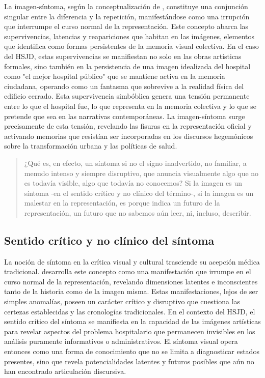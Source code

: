 La imagen-síntoma, según la conceptualización de \parencite{DidiHuberman2011}, constituye una conjunción singular entre la diferencia y la repetición, manifestándose como una irrupción que interrumpe el curso normal de la representación. Este concepto abarca las supervivencias, latencias y reapariciones que habitan en las imágenes, elementos que \parencite{Warburg2010} identifica como formas persistentes de la memoria visual colectiva. En el caso del HSJD, estas supervivencias se manifiestan no solo en las obras artísticas formales, sino también en la persistencia de una imagen idealizada del hospital como "el mejor hospital público" que se mantiene activa en la memoria ciudadana, operando como un fantasma que sobrevive a la realidad física del edificio cerrado. Esta supervivencia simbóblica genera una tensión permanente entre lo que el hospital fue, lo que representa en la memoria colectiva y lo que se pretende que sea en las narrativas contemporáneas. La imagen-síntoma surge precisamente de esta tensión, revelando las fisuras en la representación oficial y activando memorias que resistían ser incorporadas en los discursos hegemónicos sobre la transformación urbana y las políticas de salud.

\begin{quote}
¿Qué es, en efecto, un síntoma si no el signo inadvertido, no familiar, a menudo intenso y siempre disruptivo, que anuncia visualmente algo que no es todavía visible, algo que todavía no conocemos? Si la imagen es un síntoma -en el sentido crítico y no clínico del término-, si la imagen es un malestar en la representación, es porque indica un futuro de la representación, un futuro que no sabemos aún leer, ni, incluso, describir. \parencite[p. 307]{DidiHuberman2011}
\end{quote}

\subsection*{Sentido crítico y no clínico del síntoma}

La noción de síntoma en la crítica visual y cultural trasciende su acepción médica tradicional. \parencite{DidiHuberman2011} desarrolla este concepto como una manifestación que irrumpe en el curso normal de la representación, revelando dimensiones latentes e inconscientes tanto de la historia como de la imagen misma. Estas manifestaciones, lejos de ser simples anomalías, poseen un carácter crítico y disruptivo que cuestiona las certezas establecidas y las cronologías tradicionales. En el contexto del HSJD, el sentido crítico del síntoma se manifiesta en la capacidad de las imágenes artísticas para revelar aspectos del problema hospitalario que permanecen invisibles en los análisis puramente informativos o administrativos. El síntoma visual opera entonces como una forma de conocimiento que no se limita a diagnosticar estados presentes, sino que revela potencialidades latentes y futuros posibles que aún no han encontrado articulación discursiva.

